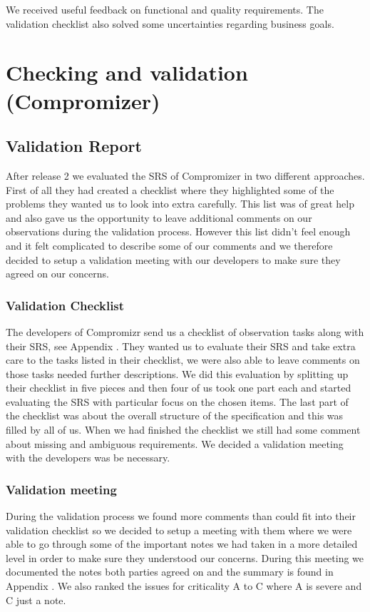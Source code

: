 \documentclass[10pt]{article}
\begin{document}
\noindent We received useful feedback on functional and quality requirements. The validation checklist also solved some uncertainties regarding business goals.

\section{Checking and validation (Compromizer)}

\subsection{Validation Report}
After release 2 we evaluated the SRS of Compromizer in two different approaches. First of all they had created a checklist where they highlighted some of the problems they wanted us to look into extra carefully. This list was of great help and also gave us the opportunity to leave additional comments on our observations during the validation process. However this list didn't feel enough and it felt complicated to describe some of our comments and we therefore decided to setup a validation meeting with our developers to make sure they agreed on our concerns.

\subsubsection{Validation Checklist}
The developers of Compromizr send us a checklist of observation tasks along with their SRS, see Appendix \cite{CompromizrChecklist}. They wanted us to evaluate their SRS and take extra care to the tasks listed in their checklist, we were also able to leave comments on those tasks needed further descriptions. We did this evaluation by splitting up their checklist in five pieces and then four of us took one part each and started evaluating the SRS with particular focus on the chosen items. The last part of the checklist was about the overall structure of the specification and this was filled by all of us.
When we had finished the checklist we still had some comment about missing and ambiguous requirements. We decided a validation meeting with the developers was be necessary.

\subsubsection{Validation meeting}
During the validation process we found more comments than could fit into their validation checklist so we decided to setup a meeting with them where we were able to go through some of the important notes we had taken in a more detailed level in order to make sure they understood our concerns. During this meeting we documented the notes both parties agreed on and the summary is found in Appendix \cite{CompromizrValidationMeeting}. We also ranked the issues for criticality A to C where A is severe and C just a note.
\end{document}
